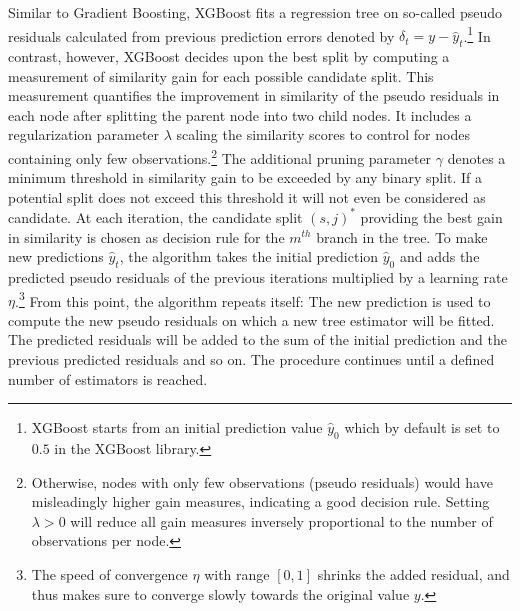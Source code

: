 \documentclass[12pt]{article}
\begin{document}
\noindent Similar to Gradient Boosting, XGBoost fits a regression tree on so-called pseudo residuals calculated from previous prediction errors denoted by $\delta_{t} = y - \hat{y}_{t}$.\footnote{XGBoost starts from an initial prediction value $\hat{y}_{0}$ which by default is set to $0.5$ in the XGBoost library.} In contrast, however, XGBoost decides upon the best split by computing a measurement of similarity gain for each possible candidate split. This measurement quantifies the improvement in similarity of the pseudo residuals in each node after splitting the parent node into two child nodes. It includes a regularization parameter $\lambda$ scaling the similarity scores to control for nodes containing only few observations.\footnote{Otherwise, nodes with only few observations (pseudo residuals) would have misleadingly higher gain measures, indicating a good decision rule. Setting $\lambda > 0$ will reduce all gain measures inversely proportional to the number of observations per node.} The additional pruning parameter $\gamma$ denotes a minimum threshold in similarity gain to be exceeded by any binary split. If a potential split does not exceed this threshold it will not even be considered as candidate. At each iteration, the candidate split $(s, j)^{*}$ providing the best gain in similarity is chosen as decision rule for the $m^{th}$ branch in the tree. To make new predictions $\hat{y}_{t}$, the algorithm takes the initial prediction $\hat{y}_{0}$ and adds the predicted pseudo residuals of the previous iterations multiplied by a learning rate $\eta$.\footnote{The speed of convergence $\eta$ with range $[0,1]$ shrinks the added residual, and thus makes sure to converge slowly towards the original value $y$.} 
From this point, the algorithm repeats itself: The new prediction is used to compute the new pseudo residuals on which a new tree estimator will be fitted. The predicted residuals will be added to the sum of the initial prediction and the previous predicted residuals and so on. The procedure continues until a defined number of estimators is reached. \\
\end{document}
